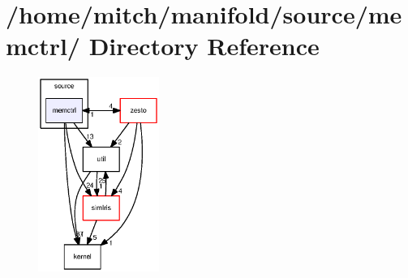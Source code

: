 \section{/home/mitch/manifold/source/memctrl/ Directory Reference}
\label{dir_d8734cd78c62b720986516d0af0d7d96}


\nopagebreak
\begin{figure}[H]
\begin{center}
\leavevmode
\includegraphics[width=112pt]{dir_d8734cd78c62b720986516d0af0d7d96_dep}
\end{center}
\end{figure}
